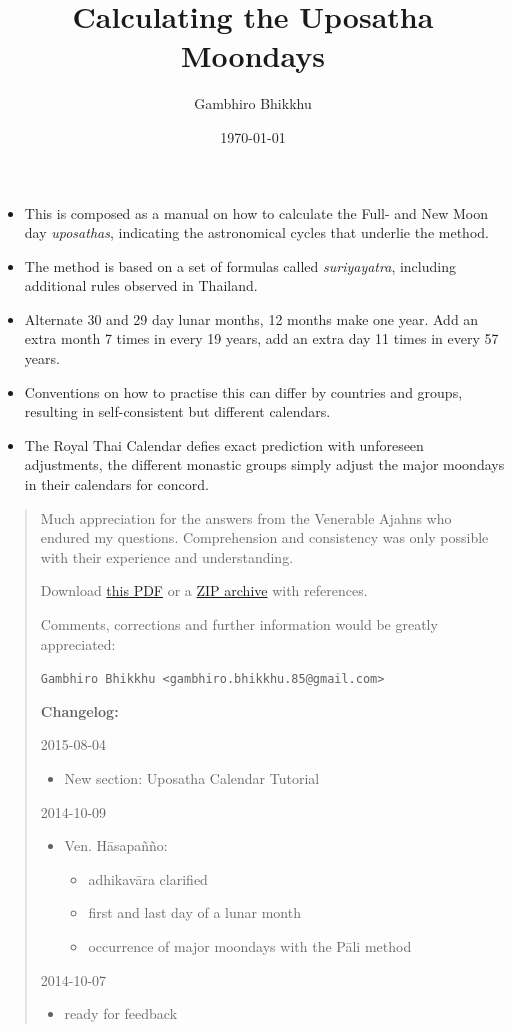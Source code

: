 \documentclass[11pt,oneside]{memoir-article}
\author{Gambhiro Bhikkhu}
\date{\today}
\title{Calculating the Uposatha Moondays}
\begin{document}
\maketitle
\begin{tldr}
\begin{itemize}
\item This is composed as a manual on how to calculate the Full- and New
Moon day \emph{uposathas}, indicating the astronomical cycles that
underlie the method.
\item The method is based on a set of formulas called \emph{suriyayatra},
including additional rules observed in Thailand.
\item Alternate 30 and 29 day lunar months, 12 months make one year. Add
an extra month 7 times in every 19 years, add an extra day 11 times
in every 57 years.
\item Conventions on how to practise this can differ by countries and
groups, resulting in self-consistent but different calendars.
\item The Royal Thai Calendar defies exact prediction with unforeseen
adjustments, the different monastic groups simply adjust the major
moondays in their calendars for concord.
\end{itemize}
\end{tldr}

\begin{quote}
Much appreciation for the answers from the Venerable Ajahns who
endured my questions. Comprehension and consistency was only possible
with their experience and understanding.

Download \href{https://github.com/profound-labs/calculating-the-uposatha-moondays/raw/master/calculating-the-uposatha-moondays.pdf}{this PDF} or a \href{https://github.com/profound-labs/calculating-the-uposatha-moondays/archive/master.zip}{ZIP archive} with references.

Comments, corrections and further information would be greatly
appreciated:

\texttt{Gambhiro Bhikkhu <gambhiro.bhikkhu.85@gmail.com>}

\textbf{Changelog:}

2015-08-04
\begin{itemize}
\item New section: Uposatha Calendar Tutorial
\end{itemize}
2014-10-09
\begin{itemize}
\item Ven. Hāsapañño:
\begin{itemize}
\item adhikavāra clarified
\item first and last day of a lunar month
\item occurrence of major moondays with the Pāli method
\end{itemize}
\end{itemize}
2014-10-07
\begin{itemize}
\item ready for feedback
\end{itemize}
\end{quote}
\end{document}
